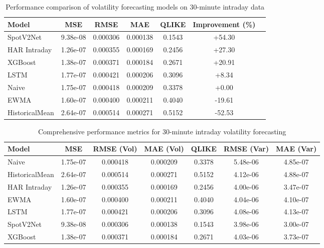 \documentclass[journal]{IEEEtran}
\begin{document}
\begin{table}[!t]
\centering
\caption{Performance comparison of volatility forecasting models on 30-minute intraday data}
\label{tab:main_results}
\begin{tabular}{@{}lcccccc@{}}
\toprule
Model & MSE & RMSE & MAE & QLIKE & Improvement (\%) \\
\midrule
SpotV2Net & 9.38e-08 & 0.000306 & 0.000138 & 0.1543 & +54.30 \\
HAR Intraday & 1.26e-07 & 0.000355 & 0.000169 & 0.2456 & +27.30 \\
XGBoost & 1.38e-07 & 0.000371 & 0.000184 & 0.2671 & +20.91 \\
LSTM & 1.77e-07 & 0.000421 & 0.000206 & 0.3096 & +8.34 \\
\rowcolor{bestcolor}Naive & 1.75e-07 & 0.000418 & 0.000209 & 0.3378 & +0.00 \\
EWMA & 1.60e-07 & 0.000400 & 0.000211 & 0.4040 & -19.61 \\
HistoricalMean & 2.64e-07 & 0.000514 & 0.000271 & 0.5152 & -52.53 \\
\bottomrule
\end{tabular}
\end{table}


\begin{table*}[!t]
\centering
\caption{Comprehensive performance metrics for 30-minute intraday volatility forecasting}
\label{tab:comprehensive_results}
\begin{tabular}{@{}lS[table-format=1.2e-1]S[table-format=1.6]S[table-format=1.6]S[table-format=1.4]S[table-format=1.2e-1]S[table-format=1.2e-1]@{}}
\toprule
{Model} & {MSE} & {RMSE (Vol)} & {MAE (Vol)} & {QLIKE} & {RMSE (Var)} & {MAE (Var)} \\
\midrule
{}Naive & 1.75e-07 & 0.000418 & 0.000209 & 0.3378 & 5.48e-06 & 4.85e-07 \\
HistoricalMean & 2.64e-07 & 0.000514 & 0.000271 & 0.5152 & 4.12e-06 & 4.88e-07 \\
HAR Intraday & 1.26e-07 & 0.000355 & 0.000169 & 0.2456 & 4.00e-06 & 3.47e-07 \\
EWMA & 1.60e-07 & 0.000400 & 0.000211 & 0.4040 & 4.04e-06 & 4.10e-07 \\
LSTM & 1.77e-07 & 0.000421 & 0.000206 & 0.3096 & 4.08e-06 & 4.13e-07 \\
SpotV2Net & 9.38e-08 & 0.000306 & 0.000138 & 0.1543 & 3.98e-06 & 3.00e-07 \\
XGBoost & 1.38e-07 & 0.000371 & 0.000184 & 0.2671 & 4.03e-06 & 3.73e-07 \\
\bottomrule
\end{tabular}
\end{table*}
\end{document}
